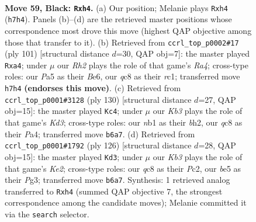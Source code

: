 \documentclass[11pt]{article}
\begin{document}
\clearpage

\begin{figure}[p]\centering
\begin{subfigure}{0.46\textwidth}\centering
\resizebox{\linewidth}{!}{%
\newchessgame
\chessboard[
  setfen={2Q5/7r/1k6/p2pBp2/P6P/8/8/RN4K1 b - - 2 59},
  showmover=false,
  pgfstyle=straightmove, color=movearrow, markmove={h7-h4}
]}
\caption{}
\end{subfigure}\hfill
\begin{subfigure}{0.46\textwidth}\centering
\resizebox{\linewidth}{!}{%
\newchessgame
\chessboard[
  setfen={8/2p3k1/4b2p/r7/P7/8/4B1P1/2R3K1 b - - 7 51},
  showmover=false,
  pgfstyle=straightmove, color=movearrow, markmove={a5-a4}
]}
\caption{}
\end{subfigure}
\\[4pt]
\begin{subfigure}{0.46\textwidth}\centering
\resizebox{\linewidth}{!}{%
\newchessgame
\chessboard[
  setfen={8/3k4/1R6/3Bp3/Pp5p/3K1P2/6rb/8 w - - 0 66},
  showmover=false,
  pgfstyle=straightmove, color=movearrow, markmove={d3-c4}
]}
\caption{}
\end{subfigure}\hfill
\begin{subfigure}{0.46\textwidth}\centering
\resizebox{\linewidth}{!}{%
\newchessgame
\chessboard[
  setfen={6R1/3k4/8/p3p3/r5p1/6P1/2P1KP2/8 w - - 10 64},
  showmover=false,
  pgfstyle=straightmove, color=movearrow, markmove={e2-d3}
]}
\caption{}
\end{subfigure}
\caption{\textbf{Move 59, Black: \texttt{Rxh4}.} (a) Our position; Melanie plays \texttt{Rxh4} (\texttt{h7h4}). Panels (b)--(d) are the retrieved master positions whose correspondence most drove this move (highest QAP objective among those that transfer to it). (b) Retrieved from \texttt{ccrl\_top\_p0002\#17} (ply 101) [structural distance $d$=30, QAP obj=7]: the master played \texttt{Rxa4}; under $\mu$ our \emph{Rh2} plays the role of that game's \emph{Ra4}; cross-type roles: our \emph{P}a5 as their \emph{B}e6, our \emph{q}c8 as their \emph{r}c1; transferred move \texttt{h7h4} \textbf{(endorses this move)}. (c) Retrieved from \texttt{ccrl\_top\_p0001\#3128} (ply 130) [structural distance $d$=27, QAP obj=15]: the master played \texttt{Kc4}; under $\mu$ our \emph{Kb3} plays the role of that game's \emph{Kd3}; cross-type roles: our \emph{n}b1 as their \emph{b}h2, our \emph{q}c8 as their \emph{P}a4; transferred move \texttt{b6a7}. (d) Retrieved from \texttt{ccrl\_top\_p0001\#1792} (ply 126) [structural distance $d$=28, QAP obj=15]: the master played \texttt{Kd3}; under $\mu$ our \emph{Kb3} plays the role of that game's \emph{Ke2}; cross-type roles: our \emph{q}c8 as their \emph{P}c2, our \emph{b}e5 as their \emph{P}g3; transferred move \texttt{b6a7}. Synthesis: 1 retrieved analog transferred to \texttt{Rxh4} (summed QAP objective 7, the strongest correspondence among the candidate moves); Melanie committed it via the \texttt{search} selector.}
\label{fig:thought-m117}
\end{figure}
\end{document}
